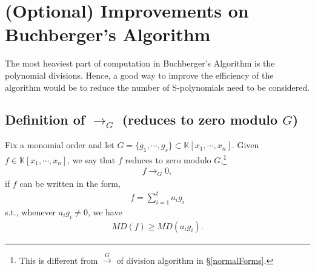 \documentclass[11pt]{book}
\begin{document}
%

\section{(Optional) Improvements on Buchberger's Algorithm}
The most heaviest part of computation in Buchberger's Algorithm is the polynomial divisions.
Hence, a good way to improve the efficiency of the algorithm would be to reduce the number of S-polynomials need to be considered.

\subsection{Definition of $\to_G$ (reduces to zero modulo $G$)}
Fix a monomial order and let $G = \{g_1, \cdots, g_s\} \subset \mathbb{K}[x_1, \cdots, x_n]$.
Given $f \in \mathbb{K}[x_1, \cdots, x_n]$, we say that $f$ reduces to zero modulo $G$,\footnote{This is different from $\stackrel{G}{\to}$ of division algorithm in \S\ref{normalForms}.}
\begin{eqnarray}
f \to_G 0,
\end{eqnarray}
if $f$ can be written in the form,
\begin{eqnarray}
f = \sum_{i=1}^t a_i g_i
\end{eqnarray}
s.t., whenever $a_i g_i \neq 0$, we have
\begin{eqnarray}
MD(f) \geq MD(a_i g_i).
\end{eqnarray}
\end{document}
